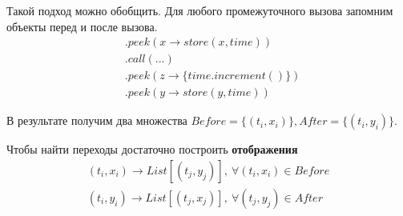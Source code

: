 \begin{frame}
\frametitle{\insertsection} 
\framesubtitle{\insertsubsection}
Такой подход можно обобщить.
Для любого промежуточного вызова запомним объекты перед и после вызова.
\begin{align*}
	&.peek(x \rightarrow store(x, time)) \\
	&.call(...)\\
	&.peek(z \rightarrow \{time.increment()\})\\
	&.peek(y \rightarrow store(y, time))
\end{align*}

В результате получим два множества $Before = \{(t_i, x_i)\}, After = \{(t_i, y_i)\}$. 

Чтобы найти переходы достаточно построить \textbf{отображения}
\begin{align*}
	(t_i, x_i) \rightarrow List[(t_j, y_j)], \ \forall (t_i, x_i) \in Before \\
	(t_i, y_i) \rightarrow List[(t_j, x_j)], \ \forall (t_j, y_j) \in After
\end{align*}

\end{frame}
